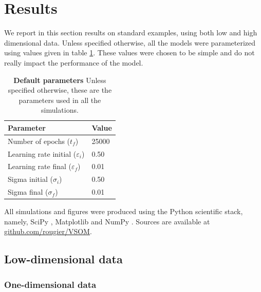 \section{Results}

We report in this section results on standard examples, using both low and high
dimensional data. Unless specified otherwise, all the models were parameterized
using values given in table \ref{table:parameters}. These values were chosen to
be simple and do not really impact the performance of the model.
\begin{table}[!ht]
  \begin{center}
    \begin{tabular}{ll}
        \textbf{Parameter} & \textbf{Value} \\
        \hline
        Number of epochs      ($t_f$)           & 25000\\
        Learning rate initial ($\varepsilon_i$) & 0.50\\
        Learning rate final   ($\varepsilon_f$) & 0.01\\
        Sigma initial         ($\sigma_i$)      & 0.50\\
        Sigma final           ($\sigma_f$)      & 0.01\\
    \end{tabular}
      \caption{\textbf{Default parameters} Unless specified otherwise, these are
        the parameters used in all the simulations.}
      \label{table:parameters}
  \end{center}
\end{table}
All simulations and figures were produced using the Python scientific stack,
namely, SciPy \citep{Jones:2001}, Matplotlib \citep{Hunter:2007} and
NumPy \citep{Walt:2011}. Sources are available at
\href{https://github.com/rougier/VSOM}{github.com/rougier/VSOM}.\\


\subsection{Low-dimensional data}

\subsubsection*{One-dimensional data}

